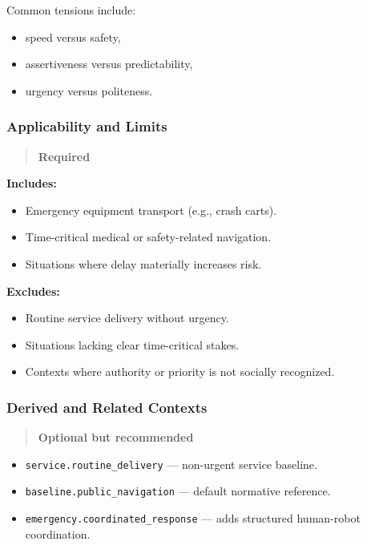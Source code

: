 \documentclass[utf8]{frontiers_suppmat} %
\providecommand{\tightlist}{%
  \setlength{\itemsep}{0pt}\setlength{\parskip}{0pt}}
\begin{document}
Common tensions include:

\begin{itemize}
\tightlist
\item
  speed versus safety,
\item
  assertiveness versus predictability,
\item
  urgency versus politeness.
\end{itemize}

\subsubsection{Applicability and Limits}\label{applicability-and-limits}

\begin{quote}
\textbf{Required}
\end{quote}

\textbf{Includes:}

\begin{itemize}
\tightlist
\item
  Emergency equipment transport (e.g., crash carts).
\item
  Time-critical medical or safety-related navigation.
\item
  Situations where delay materially increases risk.
\end{itemize}

\textbf{Excludes:}

\begin{itemize}
\tightlist
\item
  Routine service delivery without urgency.
\item
  Situations lacking clear time-critical stakes.
\item
  Contexts where authority or priority is not socially recognized.
\end{itemize}

\subsubsection{Derived and Related
Contexts}\label{derived-and-related-contexts}

\begin{quote}
\textbf{Optional but recommended}
\end{quote}

\begin{itemize}
\tightlist
\item
  \texttt{service.routine\_delivery} --- non-urgent
  service baseline.
\item
  \texttt{baseline.public\_navigation} --- default
  normative reference.
\item
  \texttt{emergency.coordinated\_response} --- adds
  structured human-robot coordination.
\end{itemize}
\end{document}
